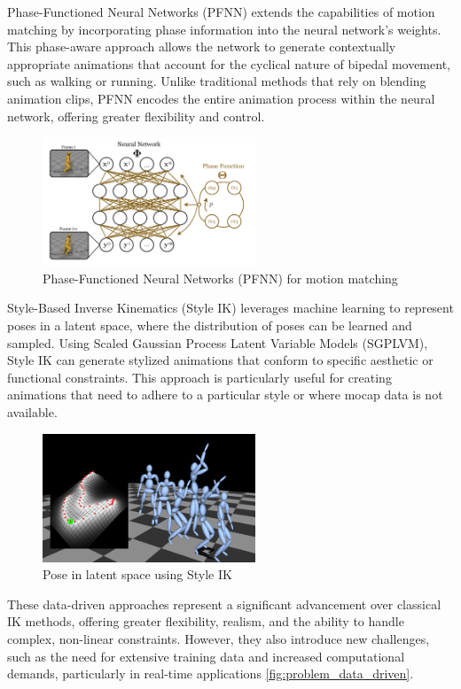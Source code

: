 \documentclass[../../main.tex]{subfiles}
\begin{document}
Phase-Functioned Neural Networks (PFNN) \cite{TODO} extends the capabilities of motion matching by incorporating phase information into the neural network's weights. This phase-aware approach allows the network to generate contextually appropriate animations that account for the cyclical nature of bipedal movement, such as walking or running. Unlike traditional methods that rely on blending animation clips, PFNN encodes the entire animation process within the neural network, offering greater flexibility and control.

\begin{figure}
  \centering \includegraphics[width = 2.5in]{chapters/motion_matching/images/pfnn.png}
  \caption{Phase-Functioned Neural Networks (PFNN) for motion matching}
  \label{fig:pfnn}
\end{figure}

Style-Based Inverse Kinematics (Style IK) leverages machine learning to represent poses in a latent space, where the distribution of poses can be learned and sampled. Using Scaled Gaussian Process Latent Variable Models (SGPLVM), Style IK can generate stylized animations that conform to specific aesthetic or functional constraints. This approach is particularly useful for creating animations that need to adhere to a particular style or where mocap data is not available\cite{TODO}.

\begin{figure}
  \centering \includegraphics[width = 2.5in]{chapters/motion_matching/images/style_ik.png}
  \caption{Pose in latent space using Style IK}
  \label{fig:style_ik}
\end{figure}

These data-driven approaches represent a significant advancement over classical IK methods, offering greater flexibility, realism, and the ability to handle complex, non-linear constraints. However, they also introduce new challenges, such as the need for extensive training data and increased computational demands, particularly in real-time applications \ref{fig:problem_data_driven}.
\end{document}
